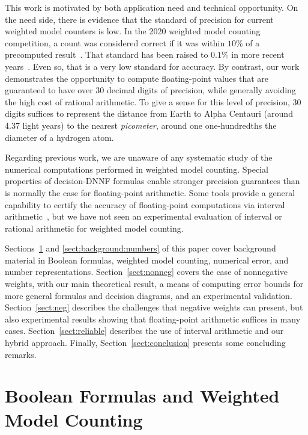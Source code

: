 \documentclass[letterpaper,USenglish,cleveref, autoref, thm-restate]{lipics-v2021}
\begin{document}
This work is motivated by both application need and technical
opportunity.  On the need side, there is evidence that the standard of
precision for current weighted model counters is low.  In the 2020
weighted model counting competition, a count was considered correct if
it was within $10\%$ of a precomputed result~\cite{fichte:jea:2020}.
That standard has been raised to $0.1\%$ in more recent
years~\cite{hecher:mc:2024}.  Even so, that is a very low standard for
accuracy.  By contrast, our work demonstrates the opportunity to
compute floating-point values that are guaranteed to have over 30 decimal
digits of precision, while generally avoiding the high cost of
rational arithmetic.  To give a sense for this level of precision,
30 digits suffices to represent the distance from
Earth to Alpha Centauri (around 4.37 light years) to the nearest \emph{picometer},
around one one-hundredths the diameter of a hydrogen atom.

Regarding previous work, we are unaware of any 
systematic study of the numerical computations
performed in weighted model counting.  Special properties of
decision-DNNF formulas enable stronger precision guarantees than is
normally the case for floating-point arithmetic.  Some tools provide a
general capability to certify the accuracy of floating-point computations
via interval arithmetic~\cite{becker:fmcad:2016}, but we have not seen an experimental
evaluation of interval or rational arithmetic for
weighted model counting.

Sections~\ref{sect:background:boolean} and
\ref{sect:background:numbers} of this paper cover background material in Boolean
formulas, weighted model counting, numerical error, and number
representations.  Section~\ref{sect:nonneg} covers the case of nonnegative weights,
with our main theoretical result,
a means of computing error bounds for more general formulas and decision diagrams,
and an experimental validation.
Section~\ref{sect:neg} describes the challenges that negative
weights can present, but also experimental results showing that
floating-point arithmetic suffices in many cases.
Section~\ref{sect:reliable} describes the use of interval
arithmetic and our hybrid approach.  
Finally, Section~\ref{sect:conclusion}
presents some concluding remarks.


\section{Boolean Formulas and Weighted Model Counting}
\label{sect:background:boolean}
\end{document}
